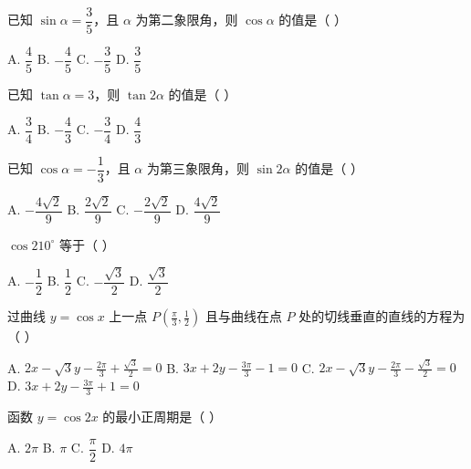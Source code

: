 \documentclass[11pt, a4paper]{article}
\begin{document}
\begin{baitap}[7]
已知 $\sin\alpha = \dfrac{3}{5}$，且 $\alpha$ 为第二象限角，则 $\cos\alpha$ 的值是（ ）
\par\vspace{3pt}
\noindent A. $\dfrac{4}{5}$ \quad B. $-\dfrac{4}{5}$ \quad C. $-\dfrac{3}{5}$ \quad D. $\dfrac{3}{5}$
\end{baitap}

\begin{baitap}[8]
已知 $\tan\alpha = 3$，则 $\tan 2\alpha$ 的值是（ ）
\par\vspace{3pt}
\noindent A. $\dfrac{3}{4}$ \quad B. $-\dfrac{4}{3}$ \quad C. $-\dfrac{3}{4}$ \quad D. $\dfrac{4}{3}$
\end{baitap}

\begin{baitap}[9]
已知 $\cos\alpha = -\dfrac{1}{3}$，且 $\alpha$ 为第三象限角，则 $\sin 2\alpha$ 的值是（ ）
\par\vspace{3pt}
\noindent A. $-\dfrac{4\sqrt{2}}{9}$ \quad B. $\dfrac{2\sqrt{2}}{9}$ \quad C. $-\dfrac{2\sqrt{2}}{9}$ \quad D. $\dfrac{4\sqrt{2}}{9}$
\end{baitap}

\begin{baitap}[10]
$\cos 210^\circ$ 等于（ ）
\par\vspace{3pt}
\noindent A. $-\dfrac{1}{2}$ \quad B. $\dfrac{1}{2}$ \quad C. $-\dfrac{\sqrt{3}}{2}$ \quad D. $\dfrac{\sqrt{3}}{2}$
\end{baitap}

\begin{baitap}[11]
过曲线 $y=\cos x$ 上一点 $P\left(\frac{\pi}{3},\frac{1}{2}\right)$ 且与曲线在点 $P$ 处的切线垂直的直线的方程为（ ）
\par\vspace{3pt}
\noindent A. $2x-\sqrt{3}y-\frac{2\pi}{3}+\frac{\sqrt{3}}{2}=0$ \quad B. $3x+2y-\frac{3\pi}{3}-1=0$ \quad C. $2x-\sqrt{3}y-\frac{2\pi}{3}-\frac{\sqrt{3}}{2}=0$ \quad D. $3x+2y-\frac{3\pi}{3}+1=0$
\end{baitap}

\begin{baitap}[12]
函数 $y = \cos 2x$ 的最小正周期是（ ）
\par\vspace{3pt}
\noindent A. $2\pi$ \quad B. $\pi$ \quad C. $\dfrac{\pi}{2}$ \quad D. $4\pi$
\end{baitap}
\end{document}
